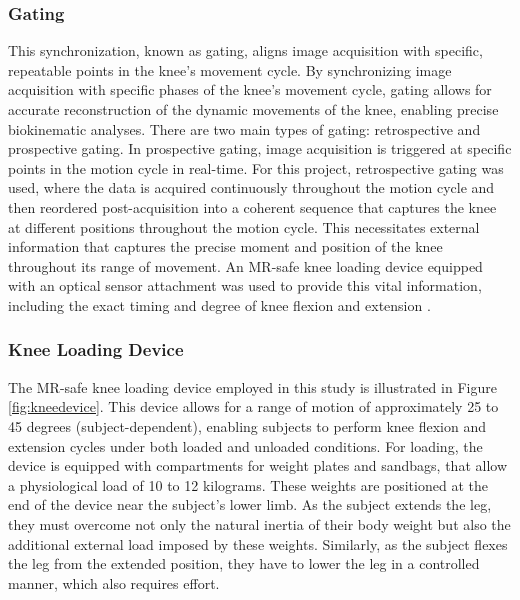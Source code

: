 \documentclass{micro-econ-thesis}
\begin{document}
\subsubsection{Gating} 

This synchronization, known as gating, aligns image acquisition with specific, repeatable points in the knee's movement cycle. By synchronizing image acquisition with specific phases of the knee's movement cycle, gating allows for accurate reconstruction of the dynamic movements of the knee, enabling precise biokinematic analyses. There are two main types of gating: retrospective and prospective gating. In prospective gating, image acquisition is triggered at specific points in the motion cycle in real-time. For this project, retrospective gating was used, where the data is acquired continuously throughout the motion cycle \parencite{edelman_clinical_1996} and then reordered post-acquisition into a coherent sequence that captures the knee at different positions throughout the motion cycle. This necessitates external information that captures the precise moment and position of the knee throughout its range of movement. An MR-safe knee loading device equipped with an optical sensor attachment was used to provide this vital information, including the exact timing and degree of knee flexion and extension \parencite{brisson_novel_2022}. 

\subsubsection{Knee Loading Device }

The MR-safe knee loading device employed in this study is illustrated in Figure \ref{fig:kneedevice}. This device allows for a range of motion of approximately 25 to 45 degrees (subject-dependent), enabling subjects to perform knee flexion and extension cycles under both loaded and unloaded conditions. For loading, the device is equipped with compartments for weight plates and sandbags, that allow a physiological load of 10 to 12 kilograms. These weights are positioned at the end of the device near the subject's lower limb. As the subject extends the leg, they must overcome not only the natural inertia of their body weight but also the additional external load imposed by these weights. Similarly, as the subject flexes the leg from the extended position, they have to lower the leg in a controlled manner, which also requires effort. 
\end{document}
